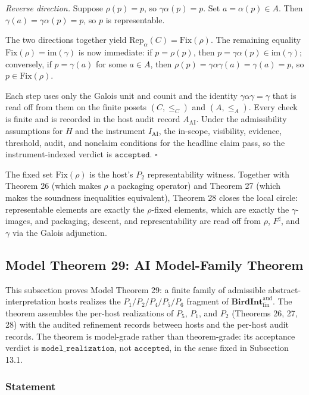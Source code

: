 \documentclass[11pt]{article}
\theoremstyle{definition}
\begin{document}
\emph{Reverse direction.} Suppose \(\rho(p)=p\), so \(\gamma\alpha(p)=p\). Set \(a=\alpha(p)\in A\). Then \(\gamma(a)=\gamma\alpha(p)=p\), so \(p\) is representable.

The two directions together yield \(\mathrm{Rep}_{\alpha}(C)=\mathrm{Fix}(\rho)\). The remaining equality \(\mathrm{Fix}(\rho)=\mathrm{im}(\gamma)\) is now immediate: if \(p=\rho(p)\), then \(p=\gamma\alpha(p)\in\mathrm{im}(\gamma)\); conversely, if \(p=\gamma(a)\) for some \(a\in A\), then \(\rho(p)=\gamma\alpha\gamma(a)=\gamma(a)=p\), so \(p\in\mathrm{Fix}(\rho)\).

Each step uses only the Galois unit and counit and the identity \(\gamma\alpha\gamma=\gamma\) that is read off from them on the finite posets \((C,\le_C)\) and \((A,\le_A)\). Every check is finite and is recorded in the host audit record \(A_{\mathrm{AI}}\). Under the admissibility assumptions for \(H\) and the instrument \(I_{\mathrm{AI}}\), the in-scope, visibility, evidence, threshold, audit, and nonclaim conditions for the headline claim pass, so the instrument-indexed verdict is \(\texttt{accepted}\). \(\square\)

The fixed set \(\mathrm{Fix}(\rho)\) is the host's \(P_2\) representability witness. Together with Theorem 26 (which makes \(\rho\) a packaging operator) and Theorem 27 (which makes the soundness inequalities equivalent), Theorem 28 closes the local circle: representable elements are exactly the \(\rho\)-fixed elements, which are exactly the \(\gamma\)-images, and packaging, descent, and representability are read off from \(\rho\), \(F^{\sharp}\), and \(\gamma\) via the Galois adjunction.

\subsection{Model Theorem 29: AI Model-Family Theorem}

This subsection proves Model Theorem 29: a finite family of admissible abstract-interpretation hosts realizes the \(P_1/P_2/P_4/P_5/P_6\) fragment of \(\mathbf{BirdInt}^{\mathrm{aud}}_{\mathrm{fin}}\). The theorem assembles the per-host realizations of \(P_5\), \(P_1\), and \(P_2\) (Theorems 26, 27, 28) with the audited refinement records between hosts and the per-host audit records. The theorem is model-grade rather than theorem-grade: its acceptance verdict is \(\texttt{model\_realization}\), not \(\texttt{accepted}\), in the sense fixed in Subsection 13.1.

\subsubsection{Statement}
\end{document}
